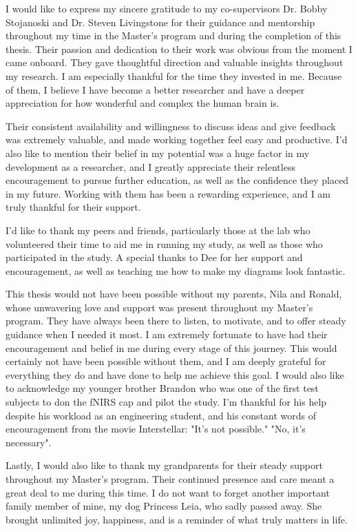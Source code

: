I would like to express my sincere gratitude to my co-supervisors Dr. Bobby Stojanoski and Dr. Steven Livingstone for their guidance and mentorship throughout my time in the Master's program and during the completion of this thesis.
Their passion and dedication to their work was obvious from the moment I came onboard.
They gave thoughtful direction and valuable insights throughout my research.
I am especially thankful for the time they invested in me.
Because of them, I believe I have become a better researcher and have a deeper appreciation for how wonderful and complex the human brain is.

Their consistent availability and willingness to discuss ideas and give feedback was extremely valuable, and made working together feel easy and productive.
I'd also like to mention their belief in my potential was a huge factor in my development as a researcher, and I greatly appreciate their relentless encouragement to pursue further education, as well as the confidence they placed in my future.
Working with them has been a rewarding experience, and I am truly thankful for their support.

I'd like to thank my peers and friends, particularly those at the lab who volunteered their time to aid me in running my study, as well as those who participated in the study.
A special thanks to Dee for her support and encouragement, as well as teaching me how to make my diagrams look fantastic.

This thesis would not have been possible without my parents, Nila and Ronald, whose unwavering love and support was present throughout my Master's program.
They have always been there to listen, to motivate, and to offer steady guidance when I needed it most.
I am extremely fortunate to have had their encouragement and belief in me during every stage of this journey.
This would certainly not have been possible without them, and I am deeply grateful for everything they do and have done to help me achieve this goal. 
I would also like to acknowledge my younger brother Brandon who was one of the first test subjects to don the fNIRS cap and pilot the study.
I'm thankful for his help despite his workload as an engineering student, and his constant words of encouragement from the movie Interstellar: "It's not possible." "No, it's necessary". 

Lastly, I would also like to thank my grandparents for their steady support throughout my Master's program.
Their continued presence and care meant a great deal to me during this time.
I do not want to forget another important family member of mine, my dog Princess Leia, who sadly passed away.
She brought unlimited joy, happiness, and is a reminder of what truly matters in life.